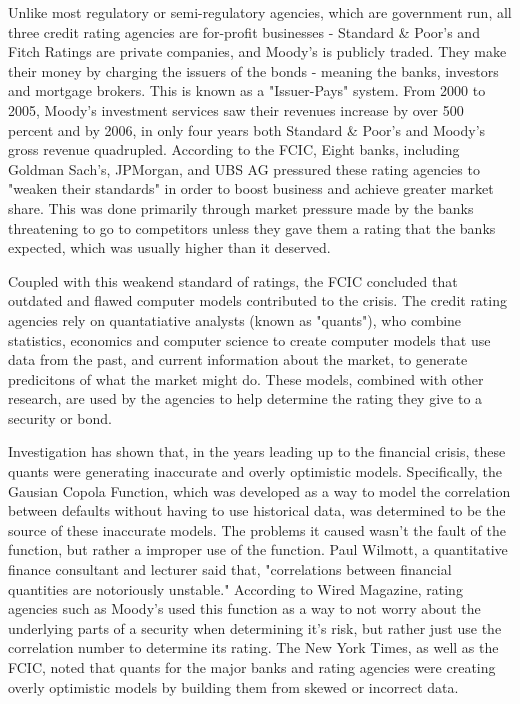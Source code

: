 \documentclass[11pt]{article}
\begin{document}
\begin{multicols}{2}
Unlike most regulatory or semi-regulatory agencies, which are government run, all three credit rating agencies are for-profit businesses - Standard \& Poor's and Fitch Ratings are private companies, and Moody's is publicly traded.  They make their money by charging the issuers of the bonds - meaning the banks, investors and mortgage brokers. This is known as a "Issuer-Pays" system. \cite{gatekeepers} From 2000 to 2005, Moody's investment services saw their revenues increase by over 500 percent\cite{gatekeepers} and by 2006, in only four years both Standard \& Poor's and Moody's gross revenue quadrupled.  According to the FCIC, Eight banks, including Goldman Sach's, JPMorgan, and UBS AG pressured these rating agencies to "weaken their standards" in order to boost business and achieve greater market share. \cite{ratingEthics} This was done primarily through market pressure made by the banks threatening to go to competitors unless they gave them a rating that the banks expected, which was usually higher than it deserved.  

Coupled with this weakend standard of ratings, the FCIC concluded that outdated and flawed computer models contributed to the crisis. \cite[p.~xxv]{govtReport} The credit rating agencies rely on quantatiative analysts (known as "quants"), who combine statistics, economics and computer science to create computer models that use data from the past, and current information about the market, to generate predicitons of what the market might do. \cite{quantsRole} These models, combined with other research, are used by the agencies to help determine the rating they give to a security or bond.

Investigation has shown that, in the years leading up to the financial crisis, these quants were generating inaccurate and overly optimistic models. Specifically, the Gausian Copola Function, which was developed as a way to model the correlation between defaults without having to use historical data, was determined to be the source of these inaccurate models. \cite{wiredFormula} The problems it caused wasn't the fault of the function, but rather a improper use of the function.  Paul Wilmott, a quantitative finance consultant and lecturer said that, "correlations between financial quantities are notoriously unstable." \cite{wiredFormula} According to Wired Magazine, rating agencies such as Moody's used this function as a way to not worry about the underlying parts of a security when determining it's risk, but rather just use the correlation number to determine its rating.  The New York Times, as well as the FCIC, noted that quants for the major banks and rating agencies were creating overly optimistic models by building them from skewed or incorrect data. \cite{nyTimesQuants, govtReport}


\end{multicols}
\end{document}

